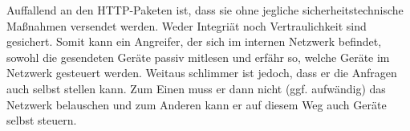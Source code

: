 Auffallend an den HTTP-Paketen ist,
dass sie ohne jegliche sicherheitstechnische Maßnahmen versendet werden.
Weder Integriät noch Vertraulichkeit sind gesichert.
Somit kann ein Angreifer, der sich im internen Netzwerk befindet,
sowohl die gesendeten Geräte passiv mitlesen und erfähr so,
welche Geräte im Netzwerk gesteuert werden.
Weitaus schlimmer ist jedoch, dass er die Anfragen auch selbst stellen kann.
Zum Einen muss er dann nicht (ggf. aufwändig) das Netzwerk belauschen
und zum Anderen kann er auf diesem Weg auch Geräte selbst steuern.